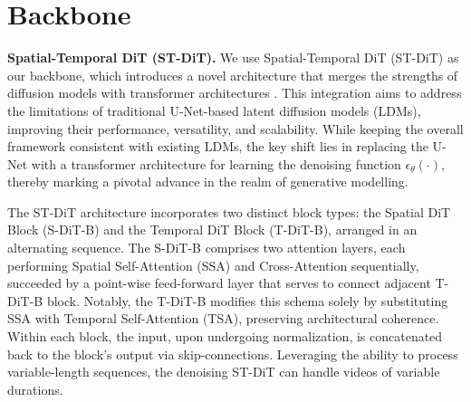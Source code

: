 
\section{Backbone}
\label{section:preliminary}


\noindent \textbf{Spatial-Temporal DiT (ST-DiT).}
We use Spatial-Temporal DiT (ST-DiT) \cite{peebles2023scalable} as our backbone, which introduces a novel architecture that merges the strengths of diffusion models with transformer architectures \cite{vaswani2017attention}. This integration aims to address the limitations of traditional U-Net-based latent diffusion models (LDMs), improving their performance, versatility, and scalability. While keeping the overall framework consistent with existing LDMs, the key shift lies in replacing the U-Net with a transformer architecture for learning the denoising function $\epsilon_\theta(\cdot)$, thereby marking a pivotal advance in the realm of generative modelling.

The ST-DiT architecture incorporates two distinct block types: the Spatial DiT Block (S-DiT-B) and the Temporal DiT Block (T-DiT-B), arranged in an alternating sequence. 
The S-DiT-B comprises two attention layers, each performing Spatial Self-Attention (SSA) and Cross-Attention sequentially, succeeded by a point-wise feed-forward layer that serves to connect adjacent T-DiT-B block. 
Notably, the T-DiT-B modifies this schema solely by substituting SSA with Temporal Self-Attention (TSA), preserving architectural coherence. 
Within each block, the input, upon undergoing normalization, is concatenated back to the block's output via skip-connections. Leveraging the ability to process variable-length sequences, the denoising ST-DiT can handle videos of variable durations.

